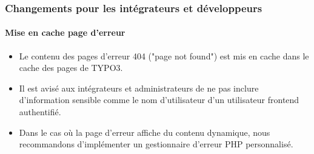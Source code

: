 %

\begin{frame}[fragile]
	\frametitle{Changements pour les intégrateurs et développeurs}
	\framesubtitle{Mise en cache page d'erreur}

	\begin{itemize}
		\item Le contenu des pages d'erreur 404 ("page not found") est mis en cache
			dans le cache des pages de TYPO3.
		\item Il est avisé aux intégrateurs et administrateurs de ne pas inclure
			d'information sensible comme le nom d'utilisateur d'un utilisateur frontend
			authentifié.
		\item Dans le cas où la page d'erreur affiche du contenu dynamique, nous recommandons
			d'implémenter un gestionnaire d'erreur PHP personnalisé.
	\end{itemize}

\end{frame}

